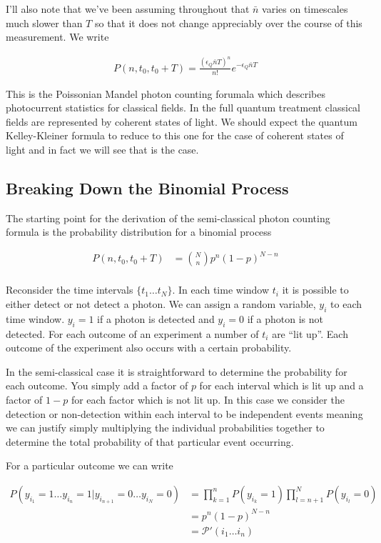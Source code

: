 \documentclass[12pt]{article}
\begin{document}
I'll also note that we've been assuming throughout that $\bar{n}$ varies on timescales much slower than $T$ so that it does not change appreciably over the course of this measurement.
We write

\begin{align}
P(n,t_0,t_0+T) = \frac{(\epsilon_Q \bar{n} T)^n}{n!} e^{-\epsilon_Q \bar{n}T}
\end{align}

This is the Poissonian Mandel photon counting forumala which describes photocurrent statistics for classical fields. In the full quantum treatment classical fields are represented by coherent states of light. We should expect the quantum Kelley-Kleiner formula to reduce to this one for the case of coherent states of light and in fact we will see that is the case.

\subsection{Breaking Down the Binomial Process}

The starting point for the derivation of the semi-classical photon counting formula is the probability distribution for a binomial process

\begin{align}
P(n,t_0,t_0+T) &= \binom{N}{n} p^n(1-p)^{N-n}\\
\end{align}

Reconsider the time intervals $\{t_1 \ldots t_N\}$. In each time window $t_i$ it is possible to either detect or not detect a photon. We can assign a random variable, $y_i$ to each time window. $y_i=1$ if a photon is detected and $y_i=0$ if a photon is not detected. For each outcome of an experiment a number of $t_i$ are ``lit up''. Each outcome of the experiment also occurs with a certain probability. 

In the semi-classical case it is straightforward to determine the probability for each outcome. You simply add a factor of $p$ for each interval which is lit up and a factor of $1-p$ for each factor which is not lit up. In this case we consider the detection or non-detection within each interval to be independent events meaning we can justify simply multiplying the individual probabilities together to determine the total probability of that particular event occurring.

For a particular outcome we can write

\begin{align}
\label{factorize}
P(y_{i_1}=1 \ldots y_{i_n}=1 | y_{i_{n+1}}=0 \ldots y_{i_N}=0) &= \prod_{k=1}^n P(y_{i_k}=1) \prod_{l=n+1}^N P(y_{i_l}=0)\\
&= p^n (1-p)^{N-n}\\
&= \mathcal{P}'(i_1 \ldots i_n)
\end{align}
\end{document}
